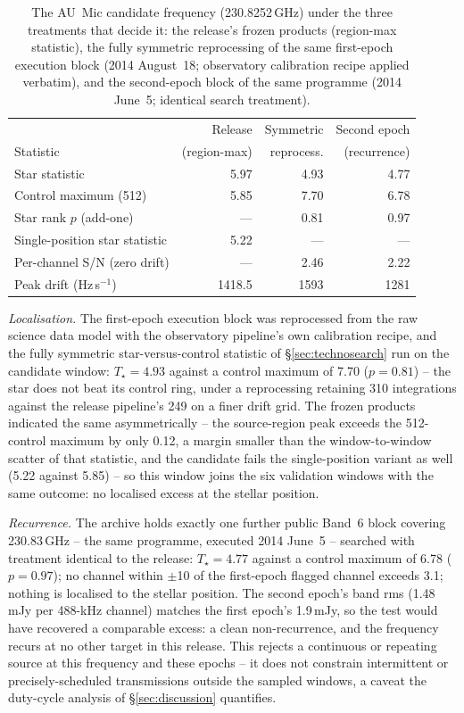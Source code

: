 \documentclass{openjournal}
\begin{document}
\begin{table}
\centering
\small
\setlength{\tabcolsep}{4pt}
\caption{The AU~Mic candidate frequency (230.8252\,GHz) under the
three treatments that decide it: the release's frozen products
(region-max statistic), the fully symmetric reprocessing of the same
first-epoch execution block (2014 August~18; observatory calibration
recipe applied verbatim), and the second-epoch block of the same
programme (2014 June~5; identical search treatment).}
\label{tab:aumic}
\begin{tabular}{@{}lrrr@{}}
\toprule
 & Release & Symmetric & Second epoch \\
Statistic & (region-max) & reprocess. & (recurrence) \\
\midrule
Star statistic & 5.97 & 4.93 & 4.77 \\
Control maximum (512) & 5.85 & 7.70 & 6.78 \\
Star rank $p$ (add-one) & --- & 0.81 & 0.97 \\
Single-position star statistic & 5.22 & --- & --- \\
Per-channel S/N (zero drift) & --- & 2.46 & 2.22 \\
Peak drift (Hz\,s$^{-1}$) & 1418.5 & 1593 & 1281 \\
\bottomrule
\end{tabular}
\end{table}

\emph{Localisation.} The first-epoch execution block was reprocessed
from the raw science data model with the observatory pipeline's own
calibration recipe, and the fully symmetric star-versus-control
statistic of \S\ref{sec:technosearch} run on the candidate window:
$T_\star=4.93$ against a control maximum of 7.70 ($p=0.81$) -- the
star does not beat its control ring, under a reprocessing retaining
310 integrations against the release pipeline's 249 on a finer drift
grid. The frozen products indicated the same asymmetrically -- the
source-region peak exceeds the 512-control maximum by only 0.12, a
margin smaller than the window-to-window scatter of that statistic,
and the candidate fails the single-position variant as well (5.22
against 5.85) -- so this window joins the six validation windows with
the same outcome: no localised excess at the stellar position.

\emph{Recurrence.} The archive holds exactly one further public
Band~6 block covering 230.83\,GHz -- the same programme, executed
2014 June~5 -- searched with treatment identical to the release:
$T_\star=4.77$ against a control maximum of 6.78 ($p=0.97$); no
channel within $\pm$10 of the first-epoch flagged channel exceeds
3.1; nothing is localised to the stellar position. The second epoch's
band rms (1.48\,mJy per 488-kHz channel) matches the first epoch's
1.9\,mJy, so the test would have recovered a comparable excess: a
clean non-recurrence, and the frequency recurs at no other target in
this release. This rejects a continuous or repeating source at this
frequency and these epochs -- it does not constrain intermittent or
precisely-scheduled transmissions outside the sampled windows, a
caveat the duty-cycle analysis of \S\ref{sec:discussion} quantifies.
\end{document}
